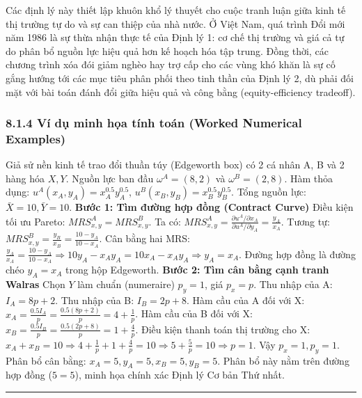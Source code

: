 \documentclass[
]{article}
\begin{document}
Các định lý này thiết lập khuôn khổ lý thuyết cho cuộc tranh luận giữa
kinh tế thị trường tự do và sự can thiệp của nhà nước. Ở Việt Nam, quá
trình Đổi mới năm 1986 là sự thừa nhận thực tế của Định lý 1: cơ chế thị
trường và giá cả tự do phân bổ nguồn lực hiệu quả hơn kế hoạch hóa tập
trung. Đồng thời, các chương trình xóa đói giảm nghèo hay trợ cấp cho
các vùng khó khăn là sự cố gắng hướng tới các mục tiêu phân phối theo
tinh thần của Định lý 2, dù phải đối mặt với bài toán đánh đổi giữa hiệu
quả và công bằng (equity-efficiency tradeoff).

\subsubsection{8.1.4 Ví dụ minh họa tính toán (Worked Numerical
Examples)}\label{vuxed-dux1ee5-minh-hux1ecda-tuxednh-touxe1n-worked-numerical-examples-24}

Giả sử nền kinh tế trao đổi thuần túy (Edgeworth box) có 2 cá nhân A, B
và 2 hàng hóa \(X, Y\). Nguồn lực ban đầu \(\omega^A = (8, 2)\) và
\(\omega^B = (2, 8)\). Hàm thỏa dụng:
\(u^A(x_A, y_A) = x_A^{0.5} y_A^{0.5}\),
\(u^B(x_B, y_B) = x_B^{0.5} y_B^{0.5}\). Tổng nguồn lực:
\(\bar{X} = 10, \bar{Y} = 10\). \textbf{Bước 1: Tìm đường hợp đồng
(Contract Curve)} Điều kiện tối ưu Pareto:
\(MRS^A_{x,y} = MRS^B_{x,y}\). Ta có:
\(MRS^A_{x,y} = \frac{\partial u^A / \partial x_A}{\partial u^A / \partial y_A} = \frac{y_A}{x_A}\).
Tương tự: \(MRS^B_{x,y} = \frac{y_B}{x_B} = \frac{10 - y_A}{10 - x_A}\).
Cân bằng hai MRS:
\(\frac{y_A}{x_A} = \frac{10 - y_A}{10 - x_A} \Rightarrow 10y_A - x_A y_A = 10x_A - x_A y_A \Rightarrow y_A = x_A\).
Đường hợp đồng là đường chéo \(y_A = x_A\) trong hộp Edgeworth.
\textbf{Bước 2: Tìm cân bằng cạnh tranh Walras} Chọn \(Y\) làm chuẩn
(numeraire) \(p_y = 1\), giá \(p_x = p\). Thu nhập của A:
\(I_A = 8p + 2\). Thu nhập của B: \(I_B = 2p + 8\). Hàm cầu của A đối
với X:
\(x_A = \frac{0.5 I_A}{p} = \frac{0.5(8p + 2)}{p} = 4 + \frac{1}{p}\).
Hàm cầu của B đối với X:
\(x_B = \frac{0.5 I_B}{p} = \frac{0.5(2p + 8)}{p} = 1 + \frac{4}{p}\).
Điều kiện thanh toán thị trường cho X:
\(x_A + x_B = 10 \Rightarrow 4 + \frac{1}{p} + 1 + \frac{4}{p} = 10 \Rightarrow 5 + \frac{5}{p} = 10 \Rightarrow p = 1\).
Vậy \(p_x = 1, p_y = 1\). Phân bổ cân bằng:
\(x_A = 5, y_A = 5, x_B = 5, y_B = 5\). Phân bổ này nằm trên đường hợp
đồng (\(5 = 5\)), minh họa chính xác Định lý Cơ bản Thứ nhất.

\begin{center}\rule{0.5\linewidth}{0.5pt}\end{center}
\end{document}
